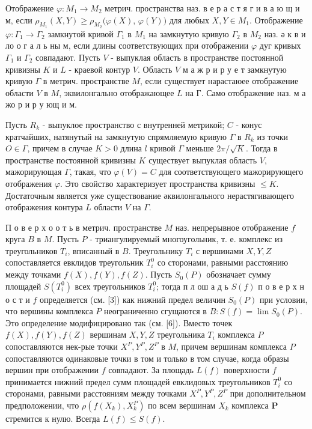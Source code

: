 \documentclass[10pt]{article}
\begin{document}
Отображение $\varphi: M_{1} \rightarrow M_{2}$ метрич. пространства наз. в е р а с т я г и в а ю щ и м, если $\rho_{M_{1}}(X, Y) \geqslant \rho_{M_{2}}(\varphi(X)$, $\varphi(Y))$ для любых $X, Y \in M_{1}$. Отображение $\varphi: \Gamma_{1} \rightarrow \Gamma_{2}$ замкнутой кривой $\Gamma_{1}$ в $M_{1}$ на замкнутую кривую $\Gamma_{2}$ в $M_{2}$ наз. ә к в и ло о г а л ь ны м, если длины соответствующих при отображении $\varphi$ дуг кривых $\Gamma_{1}$ и $\Gamma_{2}$ совпадают. Пусть $V$ - выпуклая область в пространстве постоянной кривизны $K$ и $L$ - краевой контур $V$. Область $V$ м а ж р и р у е т замкнутую кривую $\Gamma$ в метрич. пространстве $M$, если существует нарастаюее отображение области $V$ в $M$, эквилонгально отображающее $L$ на Г. Само отображение наз. м а жо р и р у ющ и м.



Пусть $R_{k}$ - выпуклое пространство с внутренней метрикой; $C$ - конус кратчайших, натянутый на замкнутую спрямляемую кривую $\Gamma$ в $R_{k}$ из точки $O \in \Gamma$, причем в случае $K>0$ длина $l$ кривой $\Gamma$ меньше $2 \pi / \sqrt{K}$. Тогда в пространстве постоянной кривизны $K$ существует выпуклая область $V$, мажорирующая $\Gamma$, такая, что $\varphi(V)=C$ для соответствующего мажорирующего отображения $\varphi$. Это свойство характеризует пространства кривизны $\leqslant K$. Достаточным является уже существование әквилонгального нерастягивающего отображения контура $L$ области $V$ на $\Gamma$.



П о в е р х о о т ь в метрич. пространстве $M$ наз. непрерывное отображение $f$ круга $B$ в $M$. Пусть $P$ - триангулируемый многоугольник, т. е. комплекс из треугольников $T_{i}$, вписанный в $B$. Треугольнику $T_{i}$ с вершинами $X, Y, Z$ сопоставляется евклидов треугольник $T_{i}^{0}$ со сторонами, равными расстоянию между точками $f(X), f(Y), f(Z)$. Пусть $S_{0}(P)$ обозначает сумму площадей $S\left(T_{i}^{0}\right)$ всех треугольников $T_{i}^{0}$; тогда п л ош а д ь $S(f)$ п о в е р х н о с т и $f$ определяется (см. [3]) как нижний предел величин $S_{0}(P)$ при условии, что вершины комплекса $P$ неограниченно сгущаются в $B: S(f)=\lim S_{0}(P)$. Это определение модифицировано так (см. [6]). Вместо точек $f(X), f(Y), f(Z)$ вершинам $X, Y, Z$ треугольника $T_{i}$ комплекса $P$ сопоставляются нек-рые точки $X^{P}, Y^{P}, Z^{P}$ в $M$, причем вершинам комплекса $P$ сопоставляются одинаковые точки в том и только в том случае, когда образы вершин при отображении $f$ совпадают. За площадь $L(f)$ поверхности $f$ принимается нижний предел сумм площадей евклидовых треугольников $T_{i}^{0}$ со сторонами, равными расстояниям между точками $X^{P}, Y^{P}, Z^{P}$ при дополнительном предположении, что $\rho\left(f\left(X_{k}\right), X_{k}^{P}\right)$ по всем вершинам $X_{k}$ комплекса $\boldsymbol{P}$ стремится к нулю. Всегда $L(f) \leqslant S(f)$.
\end{document}
